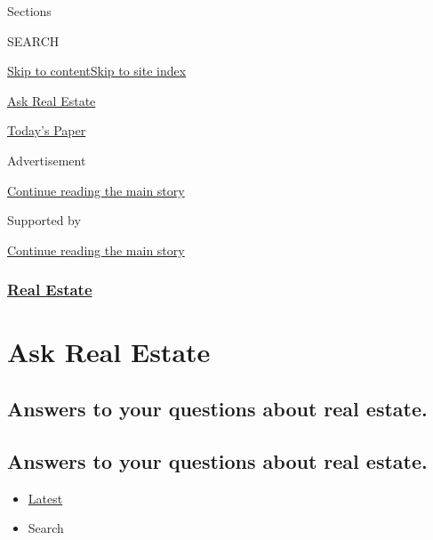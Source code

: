 Sections

SEARCH

\protect\hyperlink{site-content}{Skip to
content}\protect\hyperlink{site-index}{Skip to site index}

\href{https://www.nytimes3xbfgragh.onion/column/ask-real-estate}{Ask
Real Estate}

\href{https://myaccount.nytimes3xbfgragh.onion/auth/login?response_type=cookie\&client_id=vi}{}

\href{https://www.nytimes3xbfgragh.onion/section/todayspaper}{Today's
Paper}

Advertisement

\protect\hyperlink{after-top}{Continue reading the main story}

Supported by

\protect\hyperlink{after-sponsor}{Continue reading the main story}

\hypertarget{real-estate}{%
\subsubsection{\texorpdfstring{\href{/section/realestate}{Real
Estate}}{Real Estate}}\label{real-estate}}

\hypertarget{ask-real-estate}{%
\section{Ask Real Estate}\label{ask-real-estate}}

\hypertarget{answers-to-your-questions-about-real-estate}{%
\subsection{Answers to your questions about real
estate.}\label{answers-to-your-questions-about-real-estate}}

\hypertarget{answers-to-your-questions-about-real-estate-1}{%
\subsection{Answers to your questions about real
estate.}\label{answers-to-your-questions-about-real-estate-1}}

\begin{itemize}
\tightlist
\item
  \protect\hyperlink{stream-panel}{Latest}
\item
  Search
\end{itemize}

